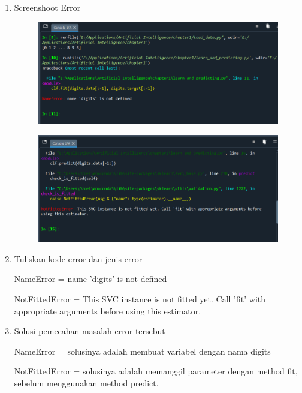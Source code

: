 \begin{enumerate}
\item Screenshoot Error
\begin{figure}[!htbp]
	\centering
	\includegraphics[scale=0.6]{figures/nameError.PNG}
\end{figure}
\begin{figure}[!htbp]
	\centering
	\includegraphics[scale=0.6]{figures/notfittederror.PNG}
\end{figure}

\newpage    
\item Tuliskan kode error dan jenis error
\par 
NameError = name 'digits' is not defined
\par
NotFittedError = This SVC instance is not fitted yet. Call 'fit' with appropriate arguments before using this estimator.

	\item
Solusi pemecahan masalah error tersebut
\par
NameError = solusinya adalah membuat variabel dengan nama digits
\par
NotFittedError = solusinya adalah memanggil parameter dengan method fit, sebelum menggunakan method predict.

\end{enumerate}

